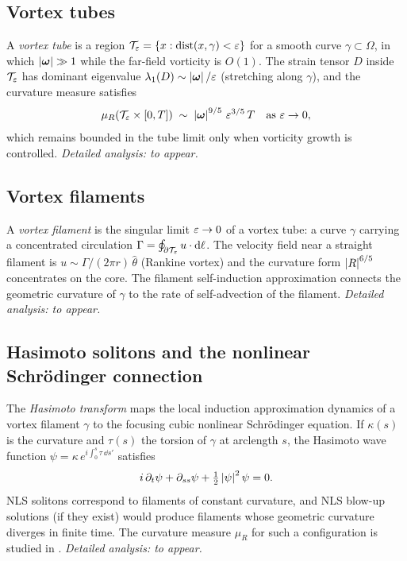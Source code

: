\subsection{Vortex tubes}\label{sec:profile-tubes}

A \emph{vortex tube} is a region $\mathcal{T}_\varepsilon = \{x : \operatorname{dist}(x, \gamma) < \varepsilon\}$
for a smooth curve $\gamma \subset \Omega$, in which $\left\lvert \boldsymbol{\omega} \right\rvert \gg 1$ while the
far-field vorticity is $O(1)$.
The strain tensor $D$ inside $\mathcal{T}_\varepsilon$ has dominant eigenvalue
$\lambda_1(D) \sim \left\lvert \boldsymbol{\omega} \right\rvert/\varepsilon$ (stretching along $\gamma$), and the
curvature measure satisfies
\[
  \mu_R(\mathcal{T}_\varepsilon \times [0,T])
  \;\sim\; \left\lvert \boldsymbol{\omega} \right\rvert^{9/5}\,\varepsilon^{3/5}\,T
  \quad \text{as } \varepsilon \to 0,
\]
which remains bounded in the tube limit only when vorticity growth is controlled.
\emph{Detailed analysis: to appear.}

\subsection{Vortex filaments}\label{sec:profile-filaments}

A \emph{vortex filament} is the singular limit $\varepsilon \to 0$ of a vortex tube:
a curve $\gamma$ carrying a concentrated circulation $\Gamma = \oint_{\partial \mathcal{T}_\varepsilon} u\cdot\mathrm{d}\ell$.
The velocity field near a straight filament is $u \sim \Gamma/(2\pi r)\,\hat{\theta}$
(Rankine vortex) and the curvature form $\left\lvert R \right\rvert^{6/5}$ concentrates on the core.
The filament self-induction approximation connects the geometric curvature of $\gamma$
to the rate of self-advection of the filament.
\emph{Detailed analysis: to appear.}

\subsection{Hasimoto solitons and the nonlinear Schr\"odinger connection}%
\label{sec:profile-hasimoto}

The \emph{Hasimoto transform} \cite{hasimoto1972soliton} maps the local induction
approximation dynamics of a vortex filament $\gamma$ to the focusing cubic
nonlinear Schr\"{o}dinger equation.  If $\kappa(s)$ is the curvature and
$\tau(s)$ the torsion of $\gamma$ at arclength $s$, the Hasimoto wave function
$\psi = \kappa\,e^{i\int_0^s \tau\,\dd s'}$ satisfies
\[
  i\,\partial_t \psi + \partial_{ss}\psi + \tfrac{1}{2}\left\lvert \psi \right\rvert^2\psi = 0.
\]
NLS solitons correspond to filaments of constant curvature, and NLS blow-up solutions
(if they exist) would produce filaments whose geometric curvature diverges in finite time.
The curvature measure $\mu_R$ for such a configuration is studied in
.
\emph{Detailed analysis: to appear.}

